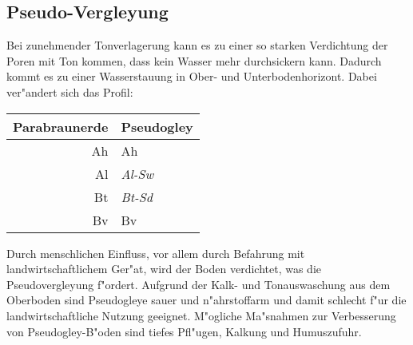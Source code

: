 \documentclass[titlepage,a4paper]{article}
\begin{document}
    \subsection{Pseudo-Vergleyung}
    Bei zunehmender Tonverlagerung kann es zu einer so starken Verdichtung der Poren mit Ton kommen, dass kein Wasser mehr durchsickern kann. Dadurch kommt es zu einer Wasserstauung in Ober- und Unterbodenhorizont. Dabei ver"andert sich das Profil:
        \begin{center}
        \begin{tabular}{|rl|}
        \hline
        Parabraunerde & Pseudogley \\
        \hline %
        Ah & Ah \\
        Al & \emph{Al-Sw} \\
        Bt & \emph{Bt-Sd} \\
        Bv & Bv \\
        \hline        
        \end{tabular}
        \end{center}
    Durch menschlichen Einfluss, vor allem durch Befahrung mit landwirtschaftlichem Ger"at, wird der Boden verdichtet, was die Pseudovergleyung f"ordert. Aufgrund der Kalk- und Tonauswaschung aus dem Oberboden sind Pseudogleye sauer und n"ahrstoffarm und damit schlecht f"ur die landwirtschaftliche Nutzung geeignet. M"ogliche Ma"snahmen zur Verbesserung von Pseudogley-B"oden sind tiefes Pfl"ugen, Kalkung und Humuszufuhr.
    
\end{document}
